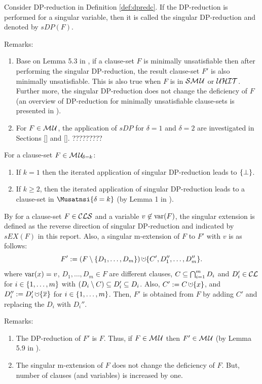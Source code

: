 \documentclass{report}
\begin{document}
\begin{defi}\label{def:singularDP}
Consider DP-reduction in Definition \ref{def:dpredc}. If the DP-reduction is performed for a singular variable, then it is called the singular DP-reduction and denoted by $sDP(F)$. 
\end{defi}
Remarks:
  \begin{enumerate}
  \item Base on Lemma 5.3 in \cite{h9}, if a clause-set $F$ is minimally unsatisfiable then after performing the singular DP-reduction, the result clause-set $F'$ is also minimally unsatisfiable. This is also true when $F$ is in $\mathcal{S}\mathcal{M\hspace{0.8pt}U}$ or $\mathcal{U}\mathcal{HIT}$.   Further more, the singular DP-reduction does not change the deficiency of $F$ (an overview of DP-reduction for minimally unsatisfiable clause-sets is presented in \cite{h29}).
  \item For $F \in \mathcal{M\hspace{0.8pt}U}$, the application of $sDP$ for $\delta=1$ and $\delta=2$ are investigated in Sections \ref{} and \ref{}. ?????????
  \end{enumerate}
  
\begin{lem}\label{lem:sDP-infl}
For a clause-set $F \in \mathcal{M\hspace{0.8pt}U}_{\!\delta=k}$:
  \begin{enumerate}
  \item If $k=1$ then the iterated application of singular DP-reduction leads to $\{ \bot \}$.
  \item If $k \ge 2$, then the iterated application of singular DP-reduction leads to a clause-set in $\Musatnsi{\delta=k}$ (by Lemma 1 in \cite{h24}).
  \end{enumerate}
\end{lem} 

\begin{defi}\label{def:singularextn}
By \cite{h9} for a clause-set $F \in\mathcal{CLS}$ and a variable $v \not \in \operatorname{var}(F)$, the singular extension is defined as the reverse direction of singular DP-reduction and indicated by $sEX(F)$ in this report. Also, a singular m-extension of $F$ to $F'$ with $v$ is as follows:
  \begin{displaymath}
    F' := (F \sm \set{D_1,\dots,D_m}) \addcup \set{C', D_1'',\dots,D_m''}.
  \end{displaymath}
where $\operatorname{var}(x)=v$, $D_1, \dots, D_m \in F$ are different clauses, $C \subseteq \bigcap_{i=1}^m D_i$ and $D_i' \in \mathcal{CL}$ for $i \in \{ 1, \dots, m \}$ with $(D_i \setminus C) \subseteq D_i' \subseteq D_i$. Also, $C' := C \addcup \set{x}$, and $D_i'' := D_i' \addcup \set{\ol{x}}$ for $i \in \{ 1, \dots, m \}$. Then, $F'$ is obtained from $F$ by adding $C'$ and replacing the $D_i$ with $D_i''$.
\end{defi}
Remarks:
  \begin{enumerate}
  \item The DP-reduction of $F'$ is $F$. Thus, if $F \in \mathcal{M\hspace{0.8pt}U}$ then $F' \in \mathcal{M\hspace{0.8pt}U}$ (by Lemma 5.9 in \cite{h9}).
  \item The singular m-extension of $F$ does not change the deficiency of $F$. But, number of clauses (and variables) is increased by one.
  \end{enumerate}
  
\end{document}
